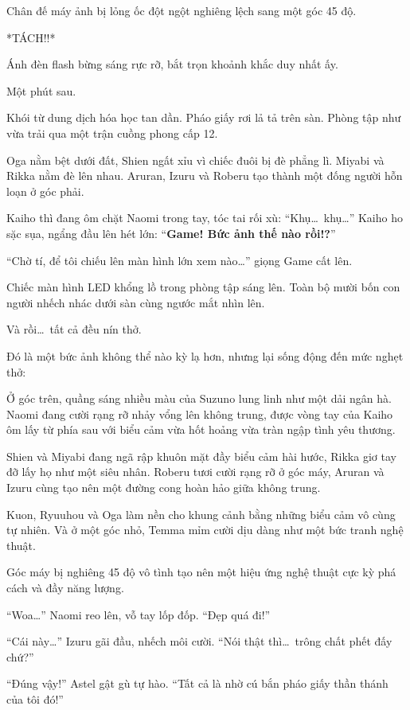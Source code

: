 \documentclass[../main.tex]{subfiles}
\begin{document}
Chân đế máy ảnh bị lỏng ốc đột ngột nghiêng lệch sang một góc 45 độ.

*TÁCH!!*

Ánh đèn flash bừng sáng rực rỡ, bắt trọn khoảnh khắc duy nhất ấy.

\begin{center}
  Một phút sau.
\end{center}

Khói từ dung dịch hóa học tan dần. Pháo giấy rơi lả tả trên sàn. Phòng tập như vừa trải qua một trận cuồng phong cấp 12.

Oga nằm bệt dưới đất, Shien ngất xỉu vì chiếc đuôi bị đè phẳng lì. Miyabi và Rikka nằm đè lên nhau. Aruran, Izuru và Roberu tạo thành một đống người hỗn loạn ở góc phải.

Kaiho thì đang ôm chặt Naomi trong tay, tóc tai rối xù: ``Khụ\dots\ khụ\dots'' Kaiho ho sặc sụa, ngẩng đầu lên hét lớn: ``\textbf{Game! Bức ảnh thế nào rồi!?}''

``Chờ tí, để tôi chiếu lên màn hình lớn xem nào\dots'' giọng Game cất lên.

Chiếc màn hình LED khổng lồ trong phòng tập sáng lên. Toàn bộ mười bốn con người nhếch nhác dưới sàn cùng ngước mắt nhìn lên.

Và rồi\dots\ tất cả đều nín thở.

Đó là một bức ảnh không thể nào kỳ lạ hơn, nhưng lại sống động đến mức nghẹt thở:

Ở góc trên, quầng sáng nhiều màu của Suzuno lung linh như một dải ngân hà. Naomi đang cười rạng rỡ nhảy vổng lên không trung, được vòng tay của Kaiho ôm lấy từ phía sau với biểu cảm vừa hốt hoảng vừa tràn ngập tình yêu thương.

Shien và Miyabi đang ngã rập khuôn mặt đầy biểu cảm hài hước, Rikka giơ tay đỡ lấy họ như một siêu nhân. Roberu tươi cười rạng rỡ ở góc máy, Aruran và Izuru cùng tạo nên một đường cong hoàn hảo giữa không trung.

Kuon, Ryuuhou và Oga làm nền cho khung cảnh bằng những biểu cảm vô cùng tự nhiên. Và ở một góc nhỏ, Temma mỉm cười dịu dàng như một bức tranh nghệ thuật.

Góc máy bị nghiêng 45 độ vô tình tạo nên một hiệu ứng nghệ thuật cực kỳ phá cách và đầy năng lượng.

``Woa\dots'' Naomi reo lên, vỗ tay lốp đốp. ``Đẹp quá đi!''

``Cái này\dots'' Izuru gãi đầu, nhếch môi cười. ``Nói thật thì\dots\ trông chất phết đấy chứ?''

``Đúng vậy!'' Astel gật gù tự hào. ``Tất cả là nhờ cú bắn pháo giấy thần thánh của tôi đó!''
\end{document}
